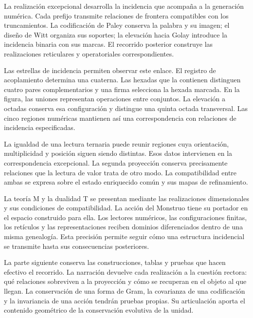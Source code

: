 
La realización excepcional desarrolla la incidencia que acompaña a
la generación numérica. Cada prefijo transmite relaciones de frontera
compatibles con los truncamientos. La codificación de Paley conserva
la palabra y su imagen; el diseño de Witt organiza sus soportes; la
elevación hacia Golay introduce la incidencia binaria con sus marcas.
El recorrido posterior construye las realizaciones reticulares y
operatoriales correspondientes.

Las estrellas de incidencia permiten observar este enlace. El
registro de acoplamiento determina una cuaterna. Las hexadas que la
contienen distinguen cuatro pares complementarios y una firma
selecciona la hexada marcada. En la figura, las uniones representan
operaciones entre conjuntos. La elevación a octadas conserva esa
configuración y distingue una quinta octada transversal. Las cinco
regiones numéricas mantienen así una correspondencia con relaciones
de incidencia especificadas.

La igualdad de una lectura ternaria puede reunir regiones cuya
orientación, multiplicidad y posición siguen siendo distintas. Esos
datos intervienen en la correspondencia excepcional. La segunda
proyección conserva precisamente relaciones que la lectura de valor
trata de otro modo. La compatibilidad entre ambas se expresa sobre
el estado enriquecido común y sus mapas de refinamiento.

La teoría M y la dualidad T se presentan mediante las realizaciones
dimensionales y sus condiciones de compatibilidad. La acción del
Monstruo tiene su portador en el espacio construido para ella. Los
lectores numéricos, las configuraciones finitas, los retículos y las
representaciones reciben dominios diferenciados dentro de una misma
genealogía. Esta precisión permite seguir cómo una estructura
incidencial se transmite hasta sus consecuencias posteriores.

La parte siguiente conserva las construcciones, tablas y pruebas
que hacen efectivo el recorrido. La narración devuelve cada
realización a la cuestión rectora: qué relaciones sobreviven a la
proyección y cómo se recuperan en el objeto al que llegan. La
conservación de una forma de Gram, la covarianza de una codificación
y la invariancia de una acción tendrán pruebas propias. Su
articulación aporta el contenido geométrico de la conservación
evolutiva de la unidad.

